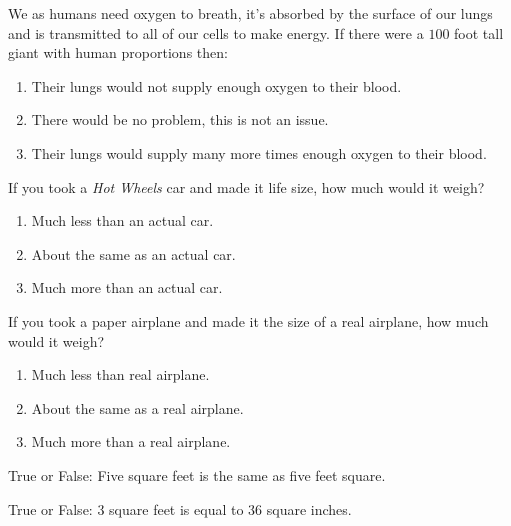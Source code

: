 \documentclass[noauthor,nooutcomes]{ximera}
\author{Bart Snapp}
\begin{document}
\maketitle







\begin{exercise}
  We as humans need oxygen to breath, it's absorbed by the surface of
  our lungs and is transmitted to all of our cells to make energy. If
  there were a $100$ foot tall giant with human proportions then:
  \begin{enumerate}
  \item Their lungs would not supply enough oxygen to their blood.
  \item There would be no problem, this is not an issue.
  \item Their lungs would supply many more times enough oxygen to their blood.
  \end{enumerate}
\end{exercise}




\begin{exercise}
  If you took a \textit{Hot Wheels} car and made it life size, how
  much would it weigh?
\begin{enumerate}
    \item Much less than an actual car.
    \item About the same as an actual car.
    \item Much more than an actual car.
\end{enumerate}

\end{exercise}



\begin{exercise}
  If you took a paper airplane and made it the size of a real
  airplane, how much would it weigh?
  \begin{enumerate}
  \item Much less than real airplane.
  \item About the same as a real airplane.
  \item Much more than a real airplane.
  \end{enumerate}
\end{exercise}




\begin{exercise}
  True or False: Five square feet is the same as five feet square.
\end{exercise}




\begin{exercise}
  True or False: $3$ square feet is equal to $36$ square inches.
\end{exercise}








\end{document}
